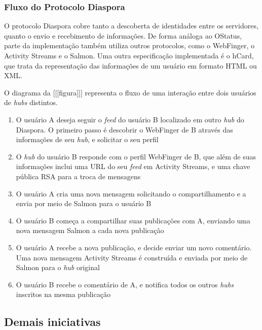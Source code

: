 \subsubsection{Fluxo do Protocolo Diaspora}

O protocolo Diaspora cobre tanto a descoberta de identidades entre os servidores,
quanto o envio e recebimento de informações. De forma análoga ao OStatus, parte da
implementação também utiliza outros protocolos, como o WebFinger, o Activity Streams
e o Salmon. Uma outra especificação implementada é o hCard, que trata da
representação das informações de um usuário em formato HTML ou XML. %

O diagrama da [[[figura]]] representa o fluxo de uma interação entre dois usuários de
\textit{hubs} distintos.



\begin{enumerate}
  \item{O usuário A deseja seguir o \textit{feed} do usuário B localizado em outro
        \textit{hub} do Diaspora. O primeiro passo é descobrir o WebFinger de B
        através das informações de seu \textit{hub}, e solicitar o seu perfil}
  \item{O \textit{hub} do usuário B responde com o perfil WebFinger de B, que além
        de suas informações inclui uma URL do seu \textit{feed} em Activity Streams,
        e uma chave pública RSA para a troca de mensagens}
  \item{O usuário A cria uma nova mensagem solicitando o compartilhamento e a envia
        por meio de Salmon para o usuário B}
  \item{O usuário B começa a compartilhar suas publicações com A, enviando uma nova
        mensagem Salmon a cada nova publicação}
  \item{O usuário A recebe a nova publicação, e decide enviar um novo comentário.
        Uma nova mensagem Activity Streams é construída e enviada por meio de Salmon
        para o \textit{hub} original}
  \item{O usuário B recebe o comentário de A, e notifica todos os outros
        \textit{hubs} inscritos na mesma publicação}
\end{enumerate}

\subsection{Demais iniciativas}

